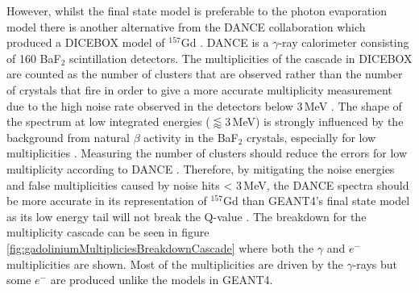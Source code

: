 
However, whilst the final state model is preferable to the photon evaporation model there is another alternative from the DANCE collaboration which produced a DICEBOX model of $^{157}$Gd \cite{Chyzh_2011}. DANCE is a $\gamma$-ray calorimeter consisting of 160 BaF$_2$ scintillation detectors. The multiplicities of the cascade in DICEBOX are counted as the number of clusters that are observed rather than the number of crystals that fire in order to give a more accurate multiplicity measurement due to the high noise rate observed in the detectors below 3\,MeV \cite{Chyzh_2011}. The shape of the spectrum at low integrated energies ($\lessapprox 3$\,MeV) is strongly influenced by the background from natural $\beta$ activity in the BaF$_2$ crystals, especially for low multiplicities \cite{Chyzh_2011}. Measuring the number of clusters should reduce the errors for low multiplicity according to DANCE \cite{Chyzh_2011}. Therefore, by mitigating the noise energies and false multiplicities caused by noise hits < 3\,MeV, the DANCE spectra should  be more accurate in its representation of $^{157}$Gd than GEANT4's final state model as its low energy tail will not break the Q-value \cite{YuChen_2015}. The breakdown for the multiplicity cascade can be seen in figure \ref{fig:gadoliniumMultipliciesBreakdownCascade} where both the $\gamma$ and $e^-$ multiplicities are shown. Most of the multiplicities are driven by the $\gamma$-rays but some $e^-$ are produced unlike the models in GEANT4. 
